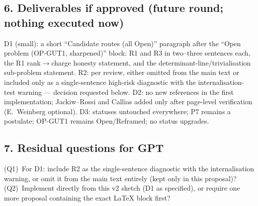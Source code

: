 \subsection*{6. Deliverables if approved (future round; nothing
executed now)}
D1 (small): a short ``Candidate routes (all Open)'' paragraph
after the ``Open problem (OP-GUT1, sharpened)'' block: R1 and R3
in two--three sentences each, the R1 rank$\to$charge honesty
statement, and the determinant-line/trivialisation sub-problem
statement.
R2: per review, either omitted from the main text or included
only as a single-sentence high-risk diagnostic with the
internalisation-test warning --- decision requested below.
D2: no new references in the first implementation; Jackiw--Rossi
and Callias added only after page-level verification (E.~Weinberg
optional).
D3: statuses untouched everywhere; P7 remains a postulate;
OP-GUT1 remains Open/Reframed; no status upgrades.

\subsection*{7. Residual questions for GPT}
(Q1)~For D1: include R2 as the single-sentence diagnostic with
the internalisation warning, or omit it from the main text
entirely (kept only in this proposal)?
(Q2)~Implement directly from this v2 sketch (D1 as specified), or
require one more proposal containing the exact LaTeX block first?
